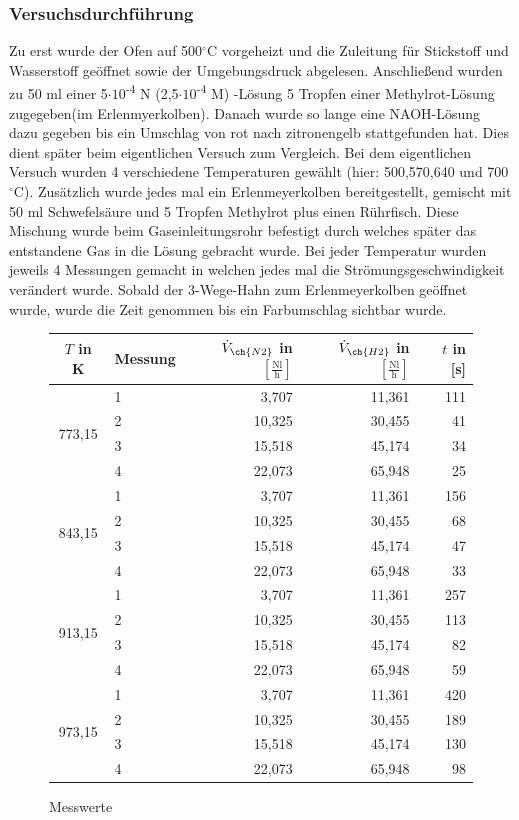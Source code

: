 \documentclass{scrartcl}
\begin{document}
\subsubsection{Versuchsdurchführung}
Zu erst wurde der Ofen auf 500$^\circ$C vorgeheizt und die Zuleitung für Stickstoff und Wasserstoff geöffnet sowie der Umgebungsdruck abgelesen. Anschließend wurden zu 50 ml einer 5$\cdot10$\textsuperscript{-4} N (2,5$\cdot10$\textsuperscript{-4} M) -Lösung 5 Tropfen einer Methylrot-Lösung zugegeben(im Erlenmyerkolben). Danach wurde so lange eine NAOH-Lösung dazu gegeben bis ein Umschlag von rot nach zitronengelb stattgefunden hat. Dies dient später beim eigentlichen Versuch zum Vergleich. Bei dem eigentlichen Versuch wurden 4 verschiedene Temperaturen gewählt (hier: 500,570,640 und 700$^\circ$C). Zusätzlich wurde jedes mal ein Erlenmeyerkolben bereitgestellt, gemischt mit 50 ml Schwefelsäure und 5 Tropfen Methylrot plus einen Rührfisch. Diese Mischung wurde beim Gaseinleitungsrohr befestigt durch welches später das entstandene Gas in die Lösung gebracht wurde. Bei jeder Temperatur wurden jeweils 4 Messungen gemacht in welchen jedes mal die Strömungsgeschwindigkeit verändert wurde. Sobald der 3-Wege-Hahn zum Erlenmeyerkolben geöffnet wurde, wurde die Zeit genommen bis ein Farbumschlag sichtbar wurde.
\begin{figure}
	\centering
	\caption{Messwerte}
	\begin{tabular}{c l r r r}
		$T$ in K & Messung & $\dot{V}_{\ch{N2}}$ in $[\frac{\text{Nl}}{\text{h}}]$ & $\dot{V}_{\ch{H2}}$ in $[\frac{\text{Nl}}{\text{h}}]$ & $t$ in [s] \\ \hline \hline
		\multirow{4}{*}{773,15} & 1 & 3,707 & 11,361 & 111 \\
		& 2 & 10,325 & 30,455 & 41 \\
		& 3 & 15,518 & 45,174 & 34 \\
		& 4 & 22,073 & 65,948 & 25 \\ \hline
		\multirow{4}{*}{843,15} & 1 & 3,707 & 11,361 & 156 \\
		& 2 & 10,325 & 30,455 & 68 \\
		& 3 & 15,518 & 45,174 & 47 \\
		& 4 & 22,073 & 65,948 & 33 \\ \hline
		\multirow{4}{*}{913,15} & 1 & 3,707 & 11,361 & 257 \\
		& 2 & 10,325 & 30,455 & 113 \\
		& 3 & 15,518 & 45,174 & 82 \\
		& 4 & 22,073 & 65,948 & 59 \\ \hline
		\multirow{4}{*}{973,15} & 1 & 3,707 & 11,361 & 420 \\
		& 2 & 10,325 & 30,455 & 189 \\
		& 3 & 15,518 & 45,174 & 130 \\
		& 4 & 22,073 & 65,948 & 98 
	\end{tabular}
\end{figure}
\end{document}
